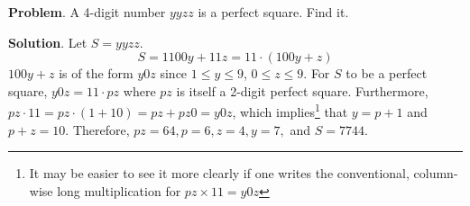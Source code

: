 \documentclass[a6paper]{article}
\begin{document}
\textbf{Problem}. A 4-digit number $yyzz$ is a perfect square. Find it.

\textbf{Solution}. Let $S=yyzz$.
$$
    S = 1100y+11z
      = 11\cdot(100y+z)
$$
$100y+z$ is of the form $y0z$ since $1 \le y \le 9$, $0 \le z \le 9$. For $S$ to be a perfect square, $y0z = 11\cdot pz$ where $pz$ is itself a 2-digit perfect square. Furthermore, $pz \cdot 11 = pz \cdot (1 + 10) = pz + pz0 = y0z$, which implies\footnote{It may be easier to see it more clearly if one writes the conventional, column-wise long multiplication for $pz \times 11 = y0z$} that $y = p+1$ and $p+z=10$. Therefore, $pz=64, p=6, z=4, y=7,$ and $S=7744$.
\end{document}
